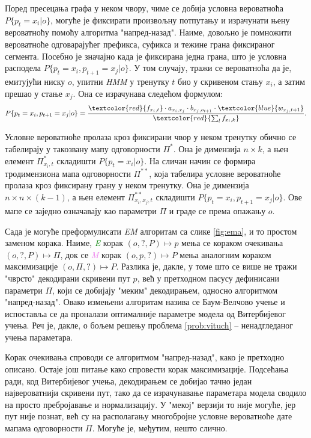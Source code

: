 \documentclass[12pt,oneside]{memoir}
\begin{document}
\begin{CJK}{UTF8}{ipxm}

Поред пресецања графа у неком чвору, чиме се добија условна вероватноћа $P\{p_t = x_i | o\}$, могуће је фиксирати произвољну потпутању и израчунати њену вероватноћу помоћу алгоритма "напред-назад". Наиме, довољно је помножити вероватноће одговарајућег префикса, суфикса и тежине грана фиксираног сегмента. Посебно је значајно када је фиксирана једна грана, што је условна расподела $P\{p_t = x_i, p_{t+1} = x_j | o\}$. У том случају, тражи се вероватноћа да је, емитујући ниску $o$, упитни \textit{HMM} у тренутку $t$ био у скривеном стању $x_i$, а затим прешао у стање $x_j$. Она се израчунава следећом формулом: $$P\{p_t = x_i, p_{t+1} = x_j | o\} = \frac{\textcolor{red}{f_{x_i, t}} \cdot a_{x_i, x_j} \cdot b_{x_j, o_{t+1}} \cdot \textcolor{blue}{w_{x_j, t+1}}}{\textcolor{red}{\sum_l f_{x_l, k}}}.$$

Условне вероватноће пролаза кроз фиксирани чвор у неком тренутку обично се табелирају у такозвану мапу одговорности $\Pi^*$. Она је димензија $n \times k$, а њен елемент $\Pi^*_{x_i, t}$ складишти $P\{p_t = x_i | o\}$. На сличан начин се формира тродимензиона мапа одговорности $\Pi^{**}$, која табелира условне вероватноће пролаза кроз фиксирану грану у неком тренутку. Она је димензија $n \times n \times (k-1)$, а њен елемент $\Pi^{**}_{x_i, x_j, t}$ складишти $P\{p_t = x_i, p_{t+1} = x_j | o\}$. Ове мапе се заједно означавају као параметри $\Pi$ и граде се према опажању $o$.

Сада је могуће преформулисати \textit{EM} алгоритам са слике \ref{fig:ema}, и то простом заменом корака. Наиме, \textit{\textcolor{green}{E}} корак $(o, ?, P) \mapsto p$ мења се кораком очекивања $(o, ?, P) \mapsto \Pi$, док се \textit{\textcolor{violet}{M}} корак $(o, p, ?) \mapsto P$ мења аналогним кораком максимизације $(o, \Pi, ?) \mapsto P$. Разлика је, дакле, у томе што се више не тражи "чврсто" декодирани скривени пут $p$, већ у претходном пасусу дефинисани параметри $\Pi$, који се добијају "меким" декодирањем, односно алгоритмом "напред-назад". Овако измењени алгоритам назива се Баум-Велчово учење и испоставља се да проналази оптималније параметре модела од Витербијевог учења. Реч је, дакле, о бољем решењу проблема \ref{prob:vituch} -- ненадгледаног учења параметара.

Корак очекивања спроводи се алгоритмом "напред-назад", како је претходно описано. Остаје још питање како спровести корак максимизације. Подсећања ради, код Витербијевог учења, декодирањем се добијао тачно један највероватнији скривени пут, тако да се израчунавање параметара модела сводило на просто пребројавање и нормализацију. У "мекој" верзији то није могуће, јер пут није познат, већ су на располагању многобројне условне вероватноће дате мапама одговорности $\Pi$. Могуће је, међутим, нешто слично.


\end{CJK}
\end{document}
